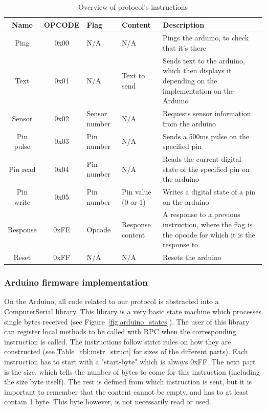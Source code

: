 \begin{table}[h!]
	\begin{tabular}{ | c | c | p{1.5cm} | p{1.7cm} | p{6cm} |}
		\hline
		\textbf{Name} & \textbf{OPCODE} & \textbf{Flag} & \textbf{Content} & \textbf{Description} \\
		\hline
		Ping & 0x00 & N/A & N/A & Pings the arduino, to check that it's there \\
		\hline
		Text & 0x01 & N/A & Text to send & Sends text to the arduino, which then displays it depending on the implementation on the Arduino \\
		\hline
		Sensor & 0x02 & Sensor number & N/A & Requests sensor information from the arduino \\
		\hline
		Pin pulse & 0x03 & Pin number & N/A & Sends a 500ms pulse on the specified pin \\
		\hline
		Pin read & 0x04 & Pin number & N/A & Reads the current digital state of the specified pin on the arduino \\
		\hline
		Pin write & 0x05 & Pin number & Pin value (0 or 1) & Writes a digital state of a pin on the arduino \\
		\hline
		Response & 0xFE & Opcode & Response content & A response to a previous instruction, where the flag is the opcode for which it is the response to \\
		\hline
		Reset & 0xFF & N/A & N/A & Resets the arduino \\
		\hline
	\end{tabular}
	\caption{Overview of protocol's instructions}
	\label{tbl:opcodes}
\end{table}

\subsubsection{Arduino firmware implementation}
On the Arduino, all code related to our protocol is abstracted into a ComputerSerial library.
This library is a very basic state machine which processes single bytes received (see Figure~\ref{fig:arduino_states}).
The user of this library can register local methods to be called with RPC when the corresponding instruction is called.
The instructions follow strict rules on how they are constructed (see Table~\ref{tbl:instr_struct} for sizes of the different parts).
Each instruction has to start with a "start-byte" which is always 0xFF. The next part is the size, which tells the number of bytes
to come for this instruction (including the size byte itself). The rest is defined from which instruction is sent, but it is important to
remember that the content cannot be empty, and has to at least contain 1 byte. This byte however, is not necessarily read or used.

